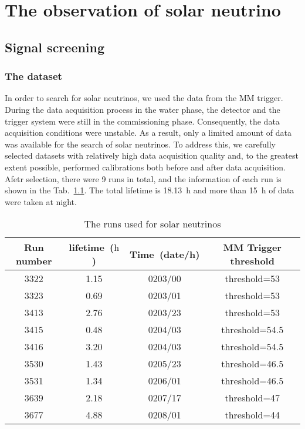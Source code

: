 \chapter{The observation of solar neutrino}
\label{chap:solar}

\section{Signal screening}
\label{sec:signal_screening}
\subsection{The dataset}
In order to search for solar neutrinos, we used the data from the MM trigger. During the data acquisition process in the water phase, the detector and the trigger system were still in the commissioning phase. Consequently, the data acquisition conditions were unstable. As a result, only a limited amount of data was available for the search of solar neutrinos. To address this, we carefully selected datasets with relatively high data acquisition quality and, to the greatest extent possible, performed calibrations both before and after data acquisition. Afetr selection, there were 9 runs in total, and the information of each run is shown in the Tab.~\ref{tab:summaryOfRuns_solar}. The total lifetime is \SI{18.13}{h} and more than \SI{15}{h} of data were taken at night.
\begin{table}[htbp]
	\centering
	\caption{The runs used for solar neutrinos}%
	\label{tab:summaryOfRuns_solar}
	\begin{tabular}{cccc}
		\toprule
		Run number & lifetime~($\text{h}$) & Time~(date/h) & MM Trigger threshold \\
		\midrule
		3322       & 1.15                  & 0203/00       & threshold=53         \\
		3323       & 0.69                  & 0203/01       & threshold=53         \\
		3413       & 2.76                  & 0203/23       & threshold=53         \\
		3415       & 0.48                  & 0204/03       & threshold=54.5       \\
		3416       & 3.20                  & 0204/03       & threshold=54.5       \\
		3530       & 1.43                  & 0205/23       & threshold=46.5       \\
		3531       & 1.34                  & 0206/01       & threshold=46.5       \\
		3639       & 2.18                  & 0207/17       & threshold=47         \\
		3677       & 4.88                  & 0208/01       & threshold=44         \\
		\bottomrule
	\end{tabular}
\end{table}

